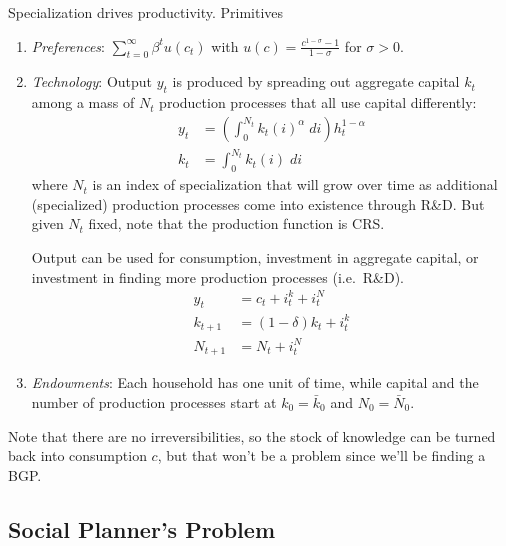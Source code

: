 \documentclass[12pt]{article}
\theoremstyle{plain}
\theoremstyle{definition}
\theoremstyle{remark}
\newcommand{\sumtinfz}{\sum^\infty_{t=0}}
\begin{document}
Specialization drives productivity. Primitives
\begin{enumerate}
  \item \emph{Preferences}: $\sumtinfz \beta^t u(c_t)$ with
    $u(c)=\frac{c^{1-\sigma}-1}{1-\sigma}$ for $\sigma>0$.
  \item \emph{Technology}:
    Output $y_t$ is produced by spreading out aggregate capital $k_t$
    among a mass of $N_t$ production processes that all use capital
    differently:
    \begin{align*}
      y_t &=
      \left(
      \int_{0}^{N_t} k_t(i)^\alpha \;di \right)
      h_t^{1-\alpha} \\
      k_t &= \int_0^{N_t} k_t(i) \; di
    \end{align*}
    where $N_t$ is an index of specialization that will grow over time
    as additional (specialized) production processes come into
    existence through R\&D. But given $N_t$ fixed, note that the
    production function is CRS.

    Output can be used for consumption, investment in aggregate
    capital, or investment in finding more production processes
    (i.e.\ R\&D).
    \begin{align*}
      y_t &= c_t + i_t^k + i_t^N \\
      k_{t+1} &= (1-\delta)k_t + i_t^k \\
      N_{t+1} &= N_t + i_t^N
    \end{align*}

  \item \emph{Endowments}: Each household has one unit of time, while
    capital and the number of production processes start at
    $k_0=\bar{k}_0$ and $N_0=\bar{N}_0$.
\end{enumerate}
Note that there are no irreversibilities, so the stock of knowledge can
be turned back into consumption $c$, but that won't be a problem since
we'll be finding a BGP.


\subsection{Social Planner's Problem}
\end{document}

